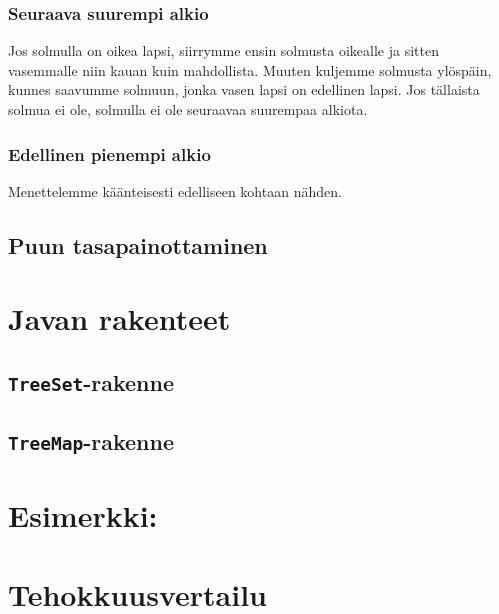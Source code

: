 \subsubsection{Seuraava suurempi alkio}

Jos solmulla on oikea lapsi, siirrymme ensin solmusta oikealle
ja sitten vasemmalle niin kauan kuin mahdollista.
Muuten kuljemme solmusta ylöspäin, kunnes saavumme solmuun,
jonka vasen lapsi on edellinen lapsi.
Jos tällaista solmua ei ole, solmulla ei ole seuraavaa
suurempaa alkiota.

\subsubsection{Edellinen pienempi alkio}

Menettelemme käänteisesti edelliseen kohtaan nähden.


\subsection{Puun tasapainottaminen}

\section{Javan rakenteet}

\subsection{\texttt{TreeSet}-rakenne}

\subsection{\texttt{TreeMap}-rakenne}

\section{Esimerkki: }

\section{Tehokkuusvertailu}
